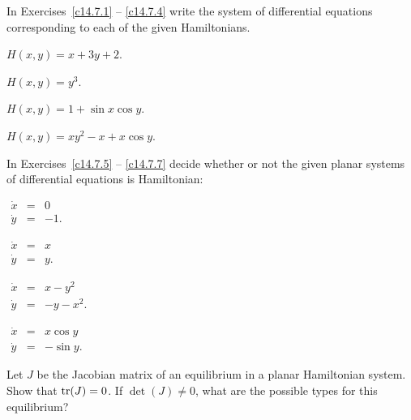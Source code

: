 \documentclass{ximera}
\begin{document}
\noindent In Exercises~\ref{c14.7.1} -- \ref{c14.7.4} write the system of 
differential equations corresponding to each of the given Hamiltonians. 
\begin{exercise} \label{c14.7.1}
$H(x,y) = x+3y+2$.
\end{exercise}
\begin{exercise} \label{c14.7.2}
$H(x,y) = y^3$.
\end{exercise}
\begin{exercise} \label{c14.7.3}
$H(x,y) = 1 + \sin x \cos y$.
\end{exercise}
\begin{exercise} \label{c14.7.4}
$H(x,y) = xy^2 - x + x\cos y$.
\end{exercise}

\noindent In Exercises~\ref{c14.7.5} -- \ref{c14.7.7} decide whether or not  
the given planar systems of differential equations is Hamiltonian:
\begin{exercise} \label{c14.7.5}
$\begin{array}{rcl}
\dot{x} & = & 0 \\
\dot{y} & = & -1.
\end{array}$
\end{exercise}
\begin{exercise} \label{c14.7.6}
$\begin{array}{rcl}
\dot{x} & = & x\\
\dot{y} & = & y.
\end{array}$
\end{exercise}
\begin{exercise} \label{c14.7.6a}
$\begin{array}{rcl}
\dot{x} & = & x - y^2\\
\dot{y} & = & -y - x^2.
\end{array}$
\end{exercise}
\begin{exercise} \label{c14.7.7}
$\begin{array}{rcl}
\dot{x} & = & x\cos y\\
\dot{y} & = & -\sin y.
\end{array}$
\end{exercise}

\begin{exercise} \label{c14.7.8}
Let $J$ be the Jacobian matrix of an equilibrium in a planar Hamiltonian 
system. Show that ${\rm tr}(J)=0$.  If $\det(J)\neq 0$, what are the possible
types for this equilibrium?
\end{exercise}
\end{document}
